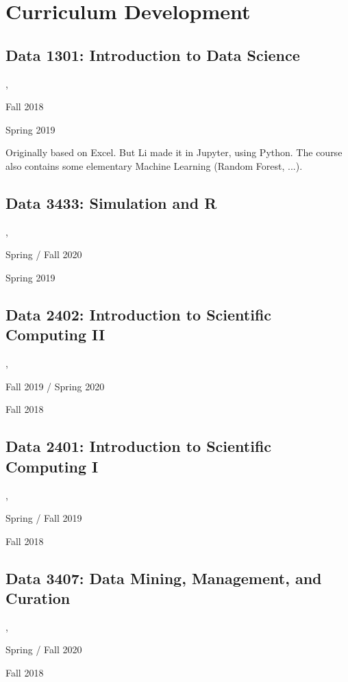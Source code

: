 \chapter{Curriculum Development}
\label{sec:CurriculumDevelopment}


\section{Data 1301: Introduction to Data Science}
\label{sec:CurriculumDevelopment:Data1301}

    \lead
        \li

    \help
        \leili, \jim

    \offer
        Fall 2018

    \dev
        Spring 2019

    Originally based on Excel. But Li made it in Jupyter, using Python. The course also contains some elementary Machine Learning (Random Forest, ...).

\section{Data 3433: Simulation and R}
\label{sec:CurriculumDevelopment:Data3433}

    \lead
        \amirs

    \help
        \walter, \suvra

    \offer
        Spring / Fall 2020

    \dev
        Spring 2019


\section{Data 2402: Introduction to Scientific Computing II}
\label{sec:CurriculumDevelopment:Data2402}

    \lead
        \amirs

    \help
        \leili, \jeff

    \offer
        Fall 2019 / Spring 2020

    \dev
        Fall 2018


\section{Data 2401: Introduction to Scientific Computing I}
\label{sec:CurriculumDevelopment:Data2401}

    \lead
        \amirf

    \help \amirs, \li

    \offer
        Spring / Fall 2019

    \dev
        Fall 2018


\section{Data 3407: Data Mining, Management, and Curation}
\label{sec:CurriculumDevelopment:Data3407}

    \lead
        \leili

    \help \amirs, \jim

    \offer
        Spring / Fall 2020

    \dev
        Fall 2018

